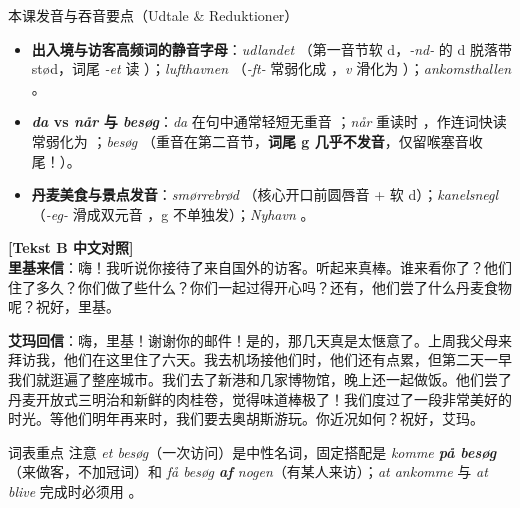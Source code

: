 \begin{tipbox}{本课发音与吞音要点（Udtale \& Reduktioner）}
\begin{itemize}
  \item \textbf{出入境与访客高频词的静音字母}：\textit{udlandet} （第一音节软 d，\textit{-nd-} 的 d 脱落带 stød，词尾 \textit{-et} 读 ）；\textit{lufthavnen} （\textit{-ft-} 常弱化成 ，\textit{v} 滑化为 ）；\textit{ankomsthallen} 。
  \item \textbf{\textit{da} vs \textit{når} 与 \textit{besøg}}：\textit{da} 在句中通常轻短无重音 ；\textit{når} 重读时 ，作连词快读常弱化为 ；\textit{besøg} （重音在第二音节，\textbf{词尾 g 几乎不发音}，仅留喉塞音收尾！）。
  \item \textbf{丹麦美食与景点发音}：\textit{smørrebrød} （核心开口前圆唇音 + 软 d）；\textit{kanelsnegl} （\textit{-eg-} 滑成双元音 ，g 不单独发）；\textit{Nyhavn} 。
\end{itemize}
\end{tipbox}

\begin{transbox}
\small
\textbf{\color{NCDTeal}[Tekst B 中文对照]}\\
\textbf{里基来信}：嗨！我听说你接待了来自国外的访客。听起来真棒。谁来看你了？他们住了多久？你们做了些什么？你们一起过得开心吗？还有，他们尝了什么丹麦食物呢？祝好，里基。

\textbf{艾玛回信}：嗨，里基！谢谢你的邮件！是的，那几天真是太惬意了。上周我父母来拜访我，他们在这里住了六天。我去机场接他们时，他们还有点累，但第二天一早我们就逛遍了整座城市。我们去了新港和几家博物馆，晚上还一起做饭。他们尝了丹麦开放式三明治和新鲜的肉桂卷，觉得味道棒极了！我们度过了一段非常美好的时光。等他们明年再来时，我们要去奥胡斯游玩。你近况如何？祝好，艾玛。
\end{transbox}


\begin{tipbox}{词表重点}
注意 \textit{et besøg}（一次访问）是中性名词，固定搭配是 \textit{komme \textbf{på besøg}}（来做客，不加冠词）和 \textit{få besøg \textbf{af} nogen}（有某人来访）；\textit{at ankomme} 与 \textit{at blive} 完成时必须用 。
\end{tipbox}

